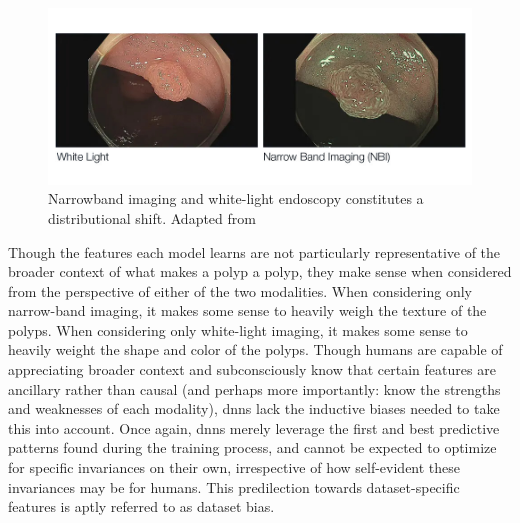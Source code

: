 	\begin{figure}[htb]
		\includegraphics[width=\linewidth]{illustrations/narrow_band.jpg}
		\caption[NBI v White-light imaging]{Narrowband imaging and white-light endoscopy constitutes a distributional shift. Adapted from~\cite{nbi_img}}
		\label{imaging_modalities}
	\end{figure}

	Though the features each model learns are not particularly representative of the broader context of what makes a polyp a polyp, they make sense when considered from the perspective of either of the two modalities. When considering only narrow-band imaging, it makes some sense to heavily weigh the texture of the polyps. When considering only white-light imaging, it makes some sense to heavily weight the shape and color of the polyps. Though humans are capable of appreciating broader context and subconsciously know that certain features are ancillary rather than causal (and perhaps more importantly: know the strengths and weaknesses of each modality), \glspl{dnn} lack the inductive biases needed to take this into account. Once again, \glspl{dnn} merely leverage the first and best predictive patterns found during the training process, and cannot be expected to optimize for specific invariances on their own, irrespective of how self-evident these invariances may be for humans. This predilection towards dataset-specific features is aptly referred to as dataset bias. 
	
